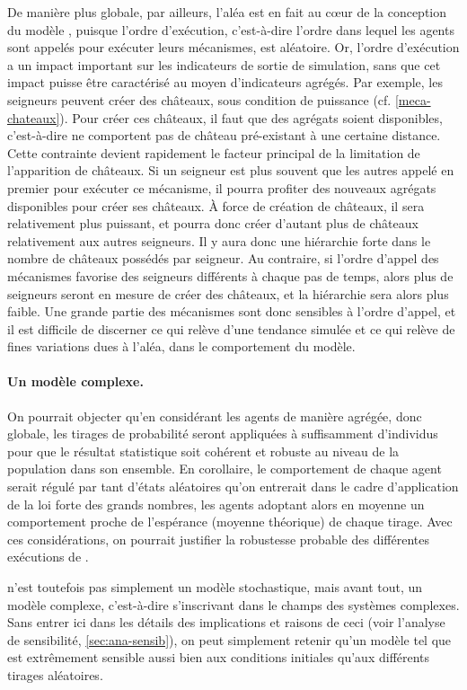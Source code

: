 De manière plus globale, par ailleurs, l'aléa est en fait au cœur de la conception du modèle \simfeodal{}, puisque l'ordre d'exécution, c'est-à-dire l'ordre dans lequel les agents sont appelés pour exécuter leurs mécanismes, est aléatoire.
Or, l'ordre d'exécution a un impact important sur les indicateurs de sortie de simulation, sans que cet impact puisse être caractérisé au moyen d'indicateurs agrégés.
Par exemple, les seigneurs peuvent créer des châteaux, sous condition de puissance (cf. \cref{meca-chateaux}).
Pour créer ces châteaux, il faut que des agrégats soient \og disponibles\fg{}, c'est-à-dire ne comportent pas de château pré-existant à une certaine distance.
Cette contrainte devient rapidement le facteur principal de la limitation de l'apparition de châteaux.
Si un seigneur est plus souvent que les autres \og appelé\fg{} en premier pour exécuter ce mécanisme, il pourra profiter des nouveaux agrégats disponibles pour créer ses châteaux.
À force de création de châteaux, il sera relativement plus puissant, et pourra donc créer d'autant plus de châteaux relativement aux autres seigneurs.
Il y aura donc une hiérarchie forte dans le nombre de châteaux possédés par seigneur.
Au contraire, si l'ordre d'appel des mécanismes favorise des seigneurs différents à chaque pas de temps, alors plus de seigneurs seront en mesure de créer des châteaux, et la hiérarchie sera alors plus faible.
Une grande partie des mécanismes sont donc sensibles à l'ordre d'appel, et il est difficile de discerner ce qui relève d'une tendance simulée et ce qui relève de fines variations dues à l'aléa, dans le comportement du modèle.

\paragraph{Un modèle complexe.}
On pourrait objecter qu'en considérant les agents de manière agrégée, donc globale, les tirages de probabilité seront appliquées à suffisamment d'individus pour que le résultat statistique soit cohérent et robuste au niveau de la population dans son ensemble.
En corollaire, le comportement de chaque agent serait régulé par tant d'états aléatoires qu'on entrerait dans le cadre d'application de la loi forte des grands nombres, les agents adoptant alors en moyenne un comportement proche de l'espérance (moyenne théorique) de chaque tirage.
Avec ces considérations, on pourrait justifier la robustesse probable des différentes exécutions de \simfeodal{}.

\simfeodal{} n'est toutefois pas simplement un modèle stochastique, mais avant tout, un modèle complexe, c'est-à-dire s'inscrivant dans le champs des systèmes complexes.
Sans entrer ici dans les détails des implications et raisons de ceci (voir l'analyse de sensibilité, \cref{sec:ana-sensib}), on peut simplement retenir qu'un modèle tel que \simfeodal{} est extrêmement sensible aussi bien aux conditions initiales qu'aux différents tirages aléatoires.

